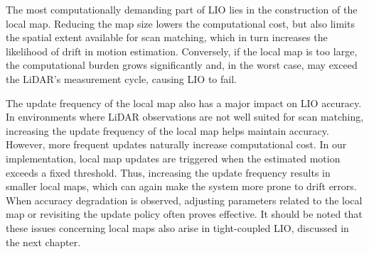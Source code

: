 The most computationally demanding part of LIO lies in the construction of the local map.
Reducing the map size lowers the computational cost, but also limits the spatial extent available for scan matching, which in turn increases the likelihood of drift in motion estimation.
Conversely, if the local map is too large, the computational burden grows significantly and, in the worst case, may exceed the LiDAR's measurement cycle, causing LIO to fail.

The update frequency of the local map also has a major impact on LIO accuracy.
In environments where LiDAR observations are not well suited for scan matching, increasing the update frequency of the local map helps maintain accuracy.
However, more frequent updates naturally increase computational cost.
In our implementation, local map updates are triggered when the estimated motion exceeds a fixed threshold.
Thus, increasing the update frequency results in smaller local maps, which can again make the system more prone to drift errors.
When accuracy degradation is observed, adjusting parameters related to the local map or revisiting the update policy often proves effective.
It should be noted that these issues concerning local maps also arise in tight-coupled LIO, discussed in the next chapter.



















